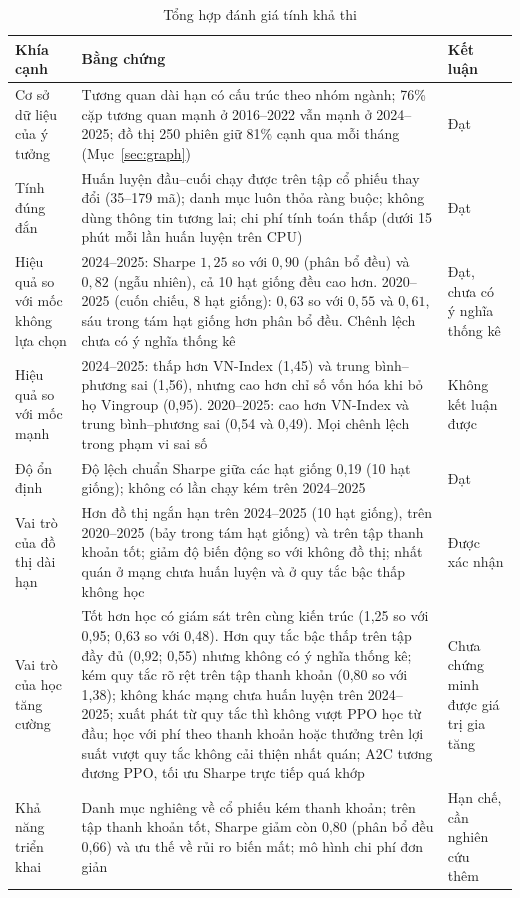 \begin{table}[ht]
\centering\small
\caption{Tổng hợp đánh giá tính khả thi}
\label{tab:feasibility}
\begin{tabularx}{\textwidth}{@{}p{3.2cm}Xp{2.3cm}@{}}
\toprule
Khía cạnh & Bằng chứng & Kết luận \\
\midrule
Cơ sở dữ liệu của ý tưởng & Tương quan dài hạn có cấu trúc theo nhóm ngành; 76\% cặp tương quan mạnh ở 2016--2022 vẫn mạnh ở 2024--2025; đồ thị 250 phiên giữ 81\% cạnh qua mỗi tháng (Mục~\ref{sec:graph}) & Đạt \\
Tính đúng đắn & Huấn luyện đầu--cuối chạy được trên tập cổ phiếu thay đổi (35--179 mã); danh mục luôn thỏa ràng buộc; không dùng thông tin tương lai; chi phí tính toán thấp (dưới 15 phút mỗi lần huấn luyện trên CPU) & Đạt \\
Hiệu quả so với mốc không lựa chọn & 2024--2025: Sharpe $1{,}25$ so với $0{,}90$ (phân bổ đều) và $0{,}82$ (ngẫu nhiên), cả 10 hạt giống đều cao hơn. 2020--2025 (cuốn chiếu, 8 hạt giống): $0{,}63$ so với $0{,}55$ và $0{,}61$, sáu trong tám hạt giống hơn phân bổ đều. Chênh lệch chưa có ý nghĩa thống kê & Đạt, chưa có ý nghĩa thống kê \\
Hiệu quả so với mốc mạnh & 2024--2025: thấp hơn VN-Index (1,45) và trung bình--phương sai (1,56), nhưng cao hơn chỉ số vốn hóa khi bỏ họ Vingroup (0,95). 2020--2025: cao hơn VN-Index và trung bình--phương sai (0,54 và 0,49). Mọi chênh lệch trong phạm vi sai số & Không kết luận được \\
Độ ổn định & Độ lệch chuẩn Sharpe giữa các hạt giống 0,19 (10 hạt giống); không có lần chạy kém trên 2024--2025 & Đạt \\
Vai trò của đồ thị dài hạn & Hơn đồ thị ngắn hạn trên 2024--2025 (10 hạt giống), trên 2020--2025 (bảy trong tám hạt giống) và trên tập thanh khoản tốt; giảm độ biến động so với không đồ thị; nhất quán ở mạng chưa huấn luyện và ở quy tắc bậc thấp không học & Được xác nhận \\
Vai trò của học tăng cường & Tốt hơn học có giám sát trên cùng kiến trúc (1,25 so với 0,95; 0,63 so với 0,48). Hơn quy tắc bậc thấp trên tập đầy đủ (0,92; 0,55) nhưng không có ý nghĩa thống kê; kém quy tắc rõ rệt trên tập thanh khoản (0,80 so với 1,38); không khác mạng chưa huấn luyện trên 2024--2025; xuất phát từ quy tắc thì không vượt PPO học từ đầu; học với phí theo thanh khoản hoặc thưởng trên lợi suất vượt quy tắc không cải thiện nhất quán; A2C tương đương PPO, tối ưu Sharpe trực tiếp quá khớp & Chưa chứng minh được giá trị gia tăng \\
Khả năng triển khai & Danh mục nghiêng về cổ phiếu kém thanh khoản; trên tập thanh khoản tốt, Sharpe giảm còn 0,80 (phân bổ đều 0,66) và ưu thế về rủi ro biến mất; mô hình chi phí đơn giản & Hạn chế, cần nghiên cứu thêm \\
\bottomrule
\end{tabularx}
\end{table}

